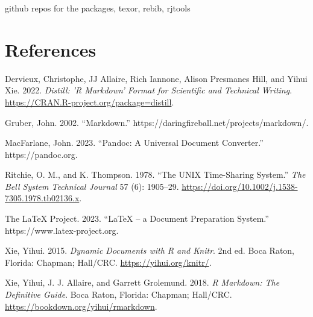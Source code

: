 github repos for the packages, texor, rebib, rjtools

\hypertarget{references}{%
\section*{References}\label{references}}

\hypertarget{refs}{}
\begin{CSLReferences}{1}{0}
\leavevmode{}%
Dervieux, Christophe, JJ Allaire, Rich Iannone, Alison Presmanes Hill, and Yihui Xie. 2022. \emph{Distill: 'R Markdown' Format for Scientific and Technical Writing}. \url{https://CRAN.R-project.org/package=distill}.

\leavevmode{}%
Gruber, John. 2002. {``Markdown.''} https://daringfireball.net/projects/markdown/.

\leavevmode{}%
MacFarlane, John. 2023. {``Pandoc: A Universal Document Converter.''} https://pandoc.org.

\leavevmode{}%
Ritchie, O. M., and K. Thompson. 1978. {``The UNIX Time-Sharing System.''} \emph{The Bell System Technical Journal} 57 (6): 1905--29. \url{https://doi.org/10.1002/j.1538-7305.1978.tb02136.x}.

\leavevmode{}%
The LaTeX Project. 2023. {``LaTeX -- a Document Preparation System.''} https://www.latex-project.org.

\leavevmode{}%
Xie, Yihui. 2015. \emph{Dynamic Documents with {R} and Knitr}. 2nd ed. Boca Raton, Florida: Chapman; Hall/CRC. \url{https://yihui.org/knitr/}.

\leavevmode{}%
Xie, Yihui, J. J. Allaire, and Garrett Grolemund. 2018. \emph{R Markdown: The Definitive Guide}. Boca Raton, Florida: Chapman; Hall/CRC. \url{https://bookdown.org/yihui/rmarkdown}.

\end{CSLReferences}



\address{%
Abhishek Ulayil\\
Student, Institute of Actuaries of India\\%
Mumbai, India\\
%
%
\textit{ORCiD: \href{https://orcid.org/0009-0000-6935-8690}{0009-0000-6935-8690}}\\%
\href{mailto:perricoq@outlook.com}{\nolinkurl{perricoq@outlook.com}}%
}

